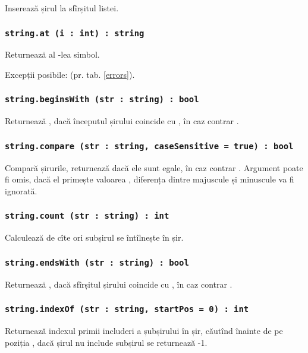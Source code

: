 Inserează șirul  la sfîrșitul listei.

\subsubsection{\lstinline|string.at (i : int) : string|}

Returnează al -lea simbol.

Excepții posibile:  (pr. tab. \ref{errors}).

\subsubsection{\lstinline|string.beginsWith (str : string) : bool|}

Returnează \true{}, dacă începutul șirului coincide cu , în caz contrar \false{}.

\subsubsection{\lstinline|string.compare (str : string, caseSensitive = true) : bool|}

Compară șirurile, returnează \true{} dacă ele sunt egale, în caz contrar \false{}. Argument  poate fi omis, dacă el primește valoarea \false{}, diferența dintre majuscule și minuscule va fi ignorată.

\subsubsection{\lstinline|string.count (str : string) : int|}

Calculează de cîte ori subșirul  se întîlnește în șir.

\subsubsection{\lstinline|string.endsWith (str : string) : bool|}

Returnează \true{}, dacă sfîrșitul șirului coincide cu , în caz contrar \false{}.

\subsubsection{\lstinline|string.indexOf (str : string, startPos = 0) : int|}

Returnează indexul primii includeri a șubșirului  în șir, căutînd înainte de pe poziția , dacă șirul nu include subșirul se returnează -1.

